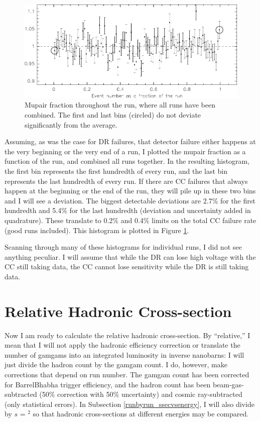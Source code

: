 \begin{figure}[p]
  \includegraphics[width=\linewidth]{plots/runbyrun_bhamutt2}
  \caption{\label{runbyrun_bhamutt2} Mupair fraction throughout the
    run, where all runs have been combined.  The first and last bins
    (circled) do not deviate significantly from the average.}
\end{figure}

Assuming, as was the case for DR failures, that detector failure
either happens at the very beginning or the very end of a run, I
plotted the mupair fraction as a function of the run, and combined all
runs together.  In the resulting histogram, the first bin represents
the first hundredth of every run, and the last bin represents the last
hundredth of every run.  If there are CC failures that always happen
at the beginning or the end of the run, they will pile up in these two
bins and I will see a deviation.  The biggest detectable deviations
are 2.7\% for the first hundredth and 5.4\% for the last hundredth
(deviation and uncertainty added in quadrature).  These translate to
0.2\% and 0.4\% limits on the total CC failure rate (good runs
included).  This histogram is plotted in Figure
\ref{runbyrun_bhamutt2}.

Scanning through many of these histograms for individual runs, I did
not see anything peculiar.  I will assume that while the DR can lose
high voltage with the CC still taking data, the CC cannot lose
sensitivity while the DR is still taking data.

\section{Relative Hadronic Cross-section}

Now I am ready to calculate the relative hadronic cross-section.  By
``relative,'' I mean that I will not apply the hadronic efficiency
correction or translate the number of gamgams into an integrated
luminosity in inverse nanobarns: I will just divide the hadron count
by the gamgam count.  I do, however, make corrections that depend on
run number.  The gamgam count has been corrected for BarrelBhabha
trigger efficiency, and the hadron count has been beam-gas-subtracted
(50\% correction with 50\% uncertainty) and cosmic ray-subtracted
(only statistical errors).  In Subsection \ref{runbyrun_ssecvsenergy},
I will also divide by $s$ = \ebeam$^2$ so that hadronic cross-sections
at different energies may be compared.

